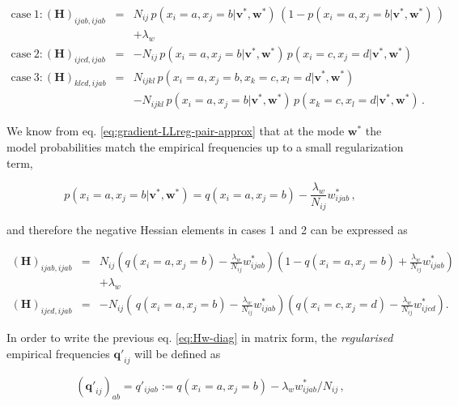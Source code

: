 \documentclass[11pt,a4paper,twoside]{book}
\newcommand{\eq}{\!=\!}
\renewcommand{\H}{\mathbf{H}}
\newcommand{\qij}{\mathbf{q\prime}_{ij}}
\renewcommand{\v}{\mathbf{v}}
\newcommand{\w}{\mathbf{w}}
\newcommand{\wijab}{w_{ijab}}
\newcommand{\wijcd}{w_{ijcd}}
\theoremstyle{definition}
\theoremstyle{definition}
\theoremstyle{remark}
\begin{document}
\begin{eqnarray}
  \mathrm{case~1:} (\H)_{ijab, ijab} &=& N_{ij} \, p(x_i \eq a, x_j \eq b| \v^*,\w^*) \, ( 1 - p(x_i \eq a, x_j \eq b| \v^*,\w^*) \,) \nonumber \\
                                      && +\lambda_w \\
  \mathrm{case~2:} (\H)_{ijcd, ijab} &=& -N_{ij} \, p(x_i \eq a, x_j \eq b |\v^*,\w^*) \, p(x_i \eq c, x_j \eq d |\v^*,\w^*) \\
  \mathrm{case~3:} (\H)_{klcd, ijab} &=& N_{ijkl} \, p(x_i \eq a, x_j \eq b, x_k \eq c, x_l \eq d  | \v^*,\w^*) \nonumber \\
                                      && -N_{ijkl} \, p(x_i \eq a, x_j \eq b | \v^*,\w^*)\, p(x_k \eq c, x_l \eq d | \v^*,\w^*) \,.
\label{eq:Hw-offdiag}
\end{eqnarray}

We know from eq. \eqref{eq:gradient-LLreg-pair-approx} that at the mode
\(\w^*\) the model probabilities match the empirical frequencies up to a
small regularization term,

\begin{equation}
    p(x_i \eq a, x_j \eq b | \v^*,\w^*) = q(x_i \eq a, x_j \eq b) - \frac{\lambda_w}{N_{ij}}  \wijab^* \,,
\end{equation}

and therefore the negative Hessian elements in cases 1 and 2 can be
expressed as

\begin{eqnarray}
   (\H)_{ijab, ijab} &=& N_{ij} \left( q(x_i \eq a, x_j \eq b)  - \frac{\lambda_w}{N_{ij}} \wijab^* \right) \left( 1 - q(x_i \eq a, x_j \eq b) +\frac{\lambda_w}{N_{ij}} \wijab^* \right) \nonumber\\
                      && +\lambda_w \\
   (\H)_{ijcd, ijab} &=& -N_{ij} \left(\,q(x_i \eq a, x_j \eq b)  - \frac{\lambda_w}{N_{ij}} \wijab^* \right) \left( q(x_i \eq c, x_j \eq d) -\frac{\lambda_w}{N_{ij}} \wijcd^* \right) .
\label{eq:Hw-diag}
\end{eqnarray}

In order to write the previous eq. \eqref{eq:Hw-diag} in matrix form, the
\emph{regularised} empirical frequencies \(\qij\) will be defined as

\begin{equation}
    (\qij)_{ab} = q'_{ijab} := q(x_i \eq a, x_j \eq b) - \lambda_w  \wijab^* / N_{ij} \,,
\end{equation}
\end{document}

